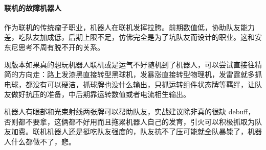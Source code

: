 ﻿\documentclass[12pt, a4paper]{article}
\begin{document}
\paragraph{联机的故障机器人}
作为联机的传统瘤子职业，机器人在联机发挥拉胯。前期数值低，协助队友能力差，吃队友加成低，后期上限不足，仿佛完全是为了坑队友而设计的职业。这和安东尼思考不周有脱不开的关系。

现版本如果真的想玩机器人联机或是运气不好随机到了机器人，可以尝试直接往精简的方向走：路上发漆黑直接转型黑球机，发暴涨直接转型物理机，发雷霆就多抓电球，都没有可以硬洁，抓球牌也没什么输出，只抓运转组件状态牌等羁绊，让队友做好抗压的准备，中后期靠运转数值或者电流相生输出。

机器人有眼部和光束射线两张牌可以帮助队友，实战建议除非真的很缺 debuff，否则都不要拿，这俩都不好用而且拖累机器人自己的发育，引火可以积极抓取为队友加费。联机机器人还是挺吃队友强度的，队友抗不了压可能就全队暴毙了，机器人什么都做不了，悲。
\end{document}
